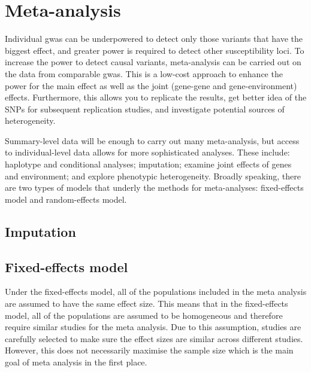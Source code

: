 \section{Meta-analysis}
\label{sec:meta_analysis}

Individual \gls{gwas} can be underpowered to detect only those variants that have the biggest effect, and greater power is required to detect other susceptibility loci.
To increase the power to detect causal variants, meta-analysis can be carried out on the data from comparable \gls{gwas}.
This is a low-cost approach to enhance the power for the main effect as well as the joint (gene-gene and gene-environment) effects.
Furthermore, this allows you to replicate the results, get better idea of the SNPs for subsequent replication studies, and investigate potential sources of heterogeneity.

Summary-level data will be enough to carry out many meta-analysis, but access to individual-level data allows for more sophisticated analyses.
These include: haplotype and conditional analyses; imputation; examine joint effects of genes and environment; and explore phenotypic heterogeneity.
Broadly speaking, there are two types of models that underly the methods for meta-analyses: fixed-effects model and random-effects model.

\subsection{Imputation}
\label{sub:imputation}







\subsection{Fixed-effects model}
\label{sub:fixed_effects_model}

Under the fixed-effects model, all of the populations included in the meta analysis are assumed to have the same effect size.
This means that in the fixed-effects model, all of the populations are assumed to be homogeneous and therefore require similar studies for the meta analysis.
Due to this assumption, studies are carefully selected to make sure the effect sizes are similar across different studies.
However, this does not necessarily maximise the sample size which is the main goal of meta analysis in the first place.

